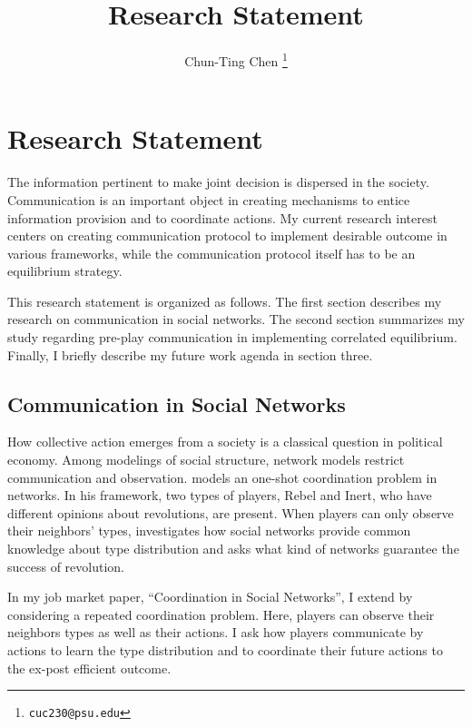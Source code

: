 \documentclass[12pt]{article}
\theoremstyle{definition}
\theoremstyle{remark}
\theoremstyle{claim}
\begin{document}

\title {Research Statement}
\author{Chun-Ting Chen%
  \thanks{\texttt{cuc230@psu.edu}}}

\date{}


\section*{Research Statement}

The information pertinent to make joint decision is dispersed in the society. Communication is an important object in creating mechanisms to entice information provision and to coordinate actions. My current research interest centers on creating communication protocol to implement desirable outcome in various frameworks, while the communication protocol itself has to be an equilibrium strategy.

This research statement is organized as follows. The first section describes my research on communication in social networks. The second section summarizes my study regarding pre-play communication in implementing correlated equilibrium. Finally, I briefly describe my future work agenda in section three.



\subsection*{Communication in Social Networks}

How collective action emerges from a society is a classical question in political economy. Among modelings of social structure, network models restrict communication and observation. \citep{Chwe2000} models an one-shot coordination problem in networks. In his framework, two types of players, Rebel and Inert, who have different opinions about revolutions, are present. When players can only observe their neighbors' types, \citep{Chwe2000} investigates how social networks provide common knowledge about type distribution and asks what kind of networks guarantee the success of revolution.

In my job market paper, ``Coordination in Social Networks'', I extend \citep{Chwe2000} by considering a repeated coordination problem. Here, players can observe their neighbors types as well as their actions. I ask how players communicate by actions to learn the type distribution and to coordinate their future actions to the ex-post efficient outcome.
\end{document}
